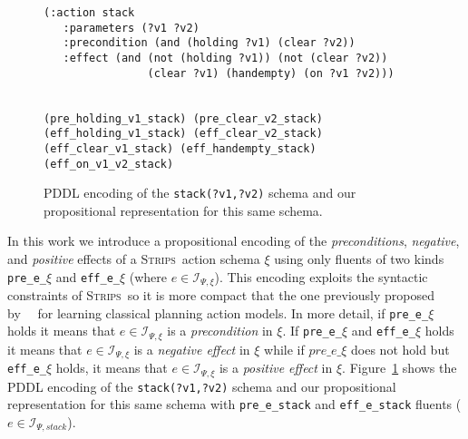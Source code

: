 \documentclass{article}
\newcommand{\strips}{\textsc{Strips}}
\begin{document}
\begin{figure}
  \begin{tiny}  
  \begin{verbatim}
(:action stack
   :parameters (?v1 ?v2)
   :precondition (and (holding ?v1) (clear ?v2))
   :effect (and (not (holding ?v1)) (not (clear ?v2))
                (clear ?v1) (handempty) (on ?v1 ?v2)))


(pre_holding_v1_stack) (pre_clear_v2_stack)
(eff_holding_v1_stack) (eff_clear_v2_stack)
(eff_clear_v1_stack) (eff_handempty_stack) (eff_on_v1_v2_stack)
  \end{verbatim}           
  \end{tiny}  
 \caption{\small PDDL encoding of the {\tt\small stack(?v1,?v2)} schema and our propositional representation for this same schema.}
\label{fig:propositional}
\end{figure}

In this work we introduce a propositional encoding of the {\em preconditions}, {\em negative}, and {\em positive} effects of a \strips\ action schema $\xi$ using only fluents of two kinds {\tt\small pre\_e\_$\xi$} and {\tt\small eff\_e\_$\xi$} (where $e\in{\mathcal I}_{\Psi,\xi}$). This encoding exploits the syntactic constraints of \strips\, so it is more compact that the one previously proposed by~\citeauthor{aineto2018learning}~\citeyear{aineto2018learning} for learning classical planning action models. In more detail, if {\tt\small pre\_e\_$\xi$} holds it means that $e\in{\mathcal I}_{\Psi,\xi}$ is a {\em precondition} in $\xi$. If {\tt\small pre\_e\_$\xi$} and {\tt\small eff\_e\_$\xi$} holds it means that $e\in{\mathcal I}_{\Psi,\xi}$ is a {\em negative effect} in $\xi$ while if $pre\_e\_\xi$ does not hold but {\tt\small eff\_e\_$\xi$} holds, it means that $e\in{\mathcal I}_{\Psi,\xi}$ is a {\em positive effect} in $\xi$. Figure~\ref{fig:propositional} shows the PDDL encoding of the {\tt\small stack(?v1,?v2)} schema and our propositional representation for this same schema with {\tt\small pre\_e\_stack} and {\tt\small eff\_e\_stack} fluents ($e\in{\mathcal I}_{\Psi,stack}$).
\end{document}
